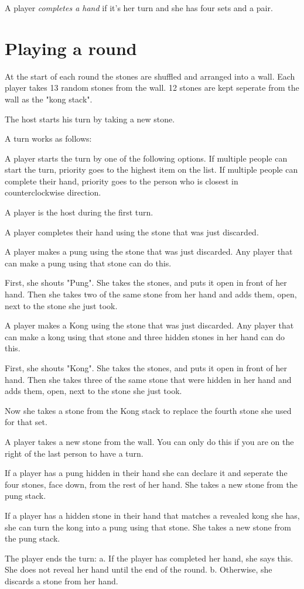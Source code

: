 \documentclass{article}
\begin{document}
A player \emph{completes a hand} if it's her turn and she has four sets and a pair.

\section{Playing a round}
At the start of each round the stones are shuffled and arranged into a wall. Each player takes 13 random stones from the wall. 12 stones are kept seperate from the wall as the "kong stack".

The host starts his turn by taking a new stone.

A turn works as follows:
\begin{enumerate*}
    \item A player starts the turn by one of the following options. If multiple people can start the turn, priority goes to the highest item on the list. If multiple people can complete their hand, priority goes to the person who is closest in counterclockwise direction.
    \begin{enumerate*}
        \item A player is the host during the first turn.
        \item A player completes their hand using the stone that was just discarded.
        \item A player makes a pung using the stone that was just discarded. Any player that can make a pung using that stone can do this.

        First, she shouts "Pung". She takes the stones, and puts it open in front of her hand. Then she takes two of the same stone from her hand and adds them, open, next to the stone she just took.
        \item A player makes a Kong using the stone that was just discarded. Any player that can make a kong using that stone and three hidden stones in her hand can do this.

        First, she shouts "Kong". She takes the stones, and puts it open in front of her hand. Then she takes three of the same stone that were hidden in her hand and adds them, open, next to the stone she just took.

        Now she takes a stone from the Kong stack to replace the fourth stone she used for that set.
        \item A player takes a new stone from the wall. You can only do this if you are on the right of the last person to have a turn.
    \end{enumerate*}
    \item If a player has a pung hidden in their hand she can declare it and seperate the four stones, face down, from the rest of her hand. She takes a new stone from the pung stack.
    \item If a player has a hidden stone in their hand that matches a revealed kong she has, she can turn the kong into a pung using that stone. She takes a new stone from the pung stack.
    \item The player ends the turn:
   a. If the player has completed her hand, she says this. She does not reveal her hand until the end of the round.
   b. Otherwise, she discards a stone from her hand.
\end{enumerate*}
\end{document}
